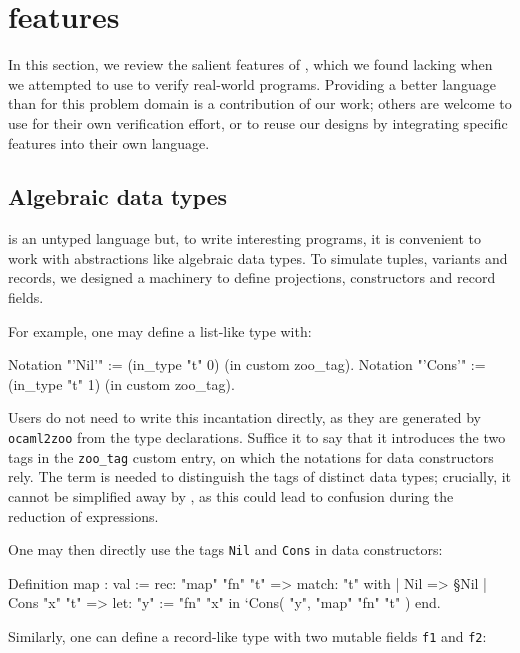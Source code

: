 \section{\Zoo features}
\label{sec:features}

In this section, we review the salient features of \Zoo, which we found lacking when we attempted to use \HeapLang to verify real-world \OCaml programs. Providing a better \Iris language than \HeapLang for this problem domain is a contribution of our work; others are welcome to use \ZooLang for their own verification effort, or to reuse our designs by integrating specific features into their own \Iris language.

\subsection{Algebraic data types}

\ZooLang is an untyped language but, to write interesting programs, it is convenient to work with abstractions like algebraic data types.
To simulate tuples, variants and records, we designed a machinery to define projections, constructors and record fields.

For example, one may define a list-like type with:

\begin{coqcode}
Notation "'Nil'"  := (in_type "t" 0) (in custom zoo_tag).
Notation "'Cons'" := (in_type "t" 1) (in custom zoo_tag).
\end{coqcode}

Users do not need to write this incantation directly, as they are generated by \texttt{ocaml2zoo} from the \OCaml type declarations.
Suffice it to say that it introduces the two tags in the \texttt{zoo\_tag} custom entry, on which the notations for data constructors rely.
The  term is needed to distinguish the tags of distinct data types; crucially, it cannot be simplified away by \Rocq, as this could lead to confusion during the reduction of expressions.

One may then directly use the tags \texttt{Nil} and \texttt{Cons} in data constructors:
\begin{coqcode}
Definition map : val := rec: "map" "fn" "t" =>
  match: "t" with
  | Nil => §Nil
  | Cons "x" "t" =>
      let: "y" := "fn" "x" in
      ‘Cons( "y", "map" "fn" "t" )
  end.
\end{coqcode}

Similarly, one can define a record-like type with two mutable fields \texttt{f1} and \texttt{f2}:

